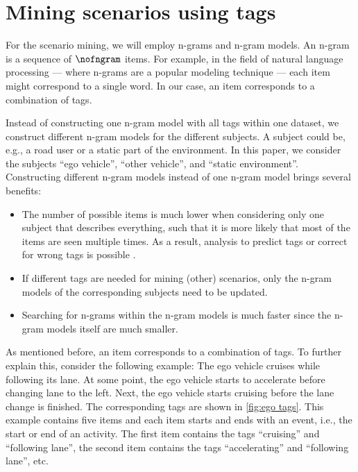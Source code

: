 \section{Mining scenarios using tags}
\label{sec:mining}

\begin{figure*}
	\centering
	
	\caption{\cstartc A snippet of an n-gram model of the ego vehicle describing the activities of the ego vehicle. Whenever one or more tags change, a new item starts.\cendc}
	\label{fig:ego tags}
\end{figure*}

\cstartb
For the scenario mining, we will employ n-grams and n-gram models. An n-gram is a sequence of $\nofngram$ items. 
For example, in the field of natural language processing --- where n-grams are a popular modeling technique \autocite{hull1982experiments, brown1992class} --- each item might correspond to a single word.
In our case, an item corresponds to a combination of tags. 

Instead of constructing one n-gram model with all tags within one dataset, we construct different n-gram models for the different subjects. A subject could be, e.g., a road user or a static part of the environment. In this paper, we consider the subjects ``ego vehicle'', ``other vehicle'', and ``static environment''.
Constructing different n-gram models instead of one n-gram model brings several benefits:
\begin{itemize}
	\item The number of possible items is much lower when considering only one subject that describes everything, such that it is more likely that most of the items are seen multiple times. 
	As a result, analysis to predict tags or correct for wrong tags is possible \autocite{lesher1998optimal}.
	\item If different tags are needed for mining (other) scenarios, only the n-gram models of the corresponding subjects need to be updated.
	\item Searching for n-grams within the n-gram models is much faster since the n-gram models itself are much smaller.
\end{itemize}

As mentioned before, an item corresponds to a combination of tags. 
To further explain this, consider the following example: The ego vehicle cruises while following its lane. 
At some point, the ego vehicle starts to accelerate before changing lane to the left. 
Next, the ego vehicle starts cruising before the lane change is finished. 
The corresponding tags are shown in \cref{fig:ego tags}.
This example contains five items and each item starts and ends with an event, i.e., the start or end of an activity.
The first item contains the tags ``cruising'' and ``following lane'', the second item contains the tags ``accelerating'' and ``following lane'', etc.

